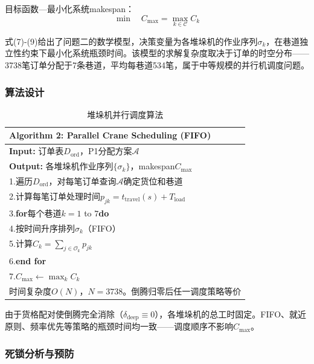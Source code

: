 \documentclass[a4paper]{cumcmthesis}
\newcommand{\headcol}{\rowcolor{tableheadcolor}}
\newcommand{\cO}{\mathcal{O}}
\newcommand{\cC}{\mathcal{C}}
\begin{document}
目标函数---最小化系统makespan：
\begin{equation}
\min\quad C_{\max}=\max_{k\in\cC}C_k
\end{equation}

式(7)-(9)给出了问题二的数学模型，决策变量为各堆垛机的作业序列$\sigma_k$，在巷道独立性约束下最小化系统瓶颈时间。该模型的求解复杂度取决于订单的时空分布——3738笔订单分配于7条巷道，平均每巷道534笔，属于中等规模的并行机调度问题。

\FloatBarrier\subsubsection{算法设计}

\begin{table}[htbp]
\centering\footnotesize
\caption{堆垛机并行调度算法}
\label{tab:algo2}
\begin{tabular}{p{}}
\toprule
\headcol \textbf{Algorithm 2: Parallel Crane Scheduling (FIFO)}\\
\midrule
\textbf{Input:} 订单表$D_{\text{ord}}$，P1分配方案$\mathcal{A}$\\
\textbf{Output:} 各堆垛机作业序列$\{\sigma_k\}$，makespan$C_{\max}$\\
\midrule
1.\quad 遍历$D_{\text{ord}}$，对每笔订单查询$\mathcal{A}$确定货位和巷道\\
2.\quad 计算每笔订单处理时间$p_{jk}=t_{\text{travel}}(s)+T_{\text{load}}$\\
3.\quad \textbf{for}每个巷道$k=1$ to $7$\textbf{do}\\
4.\quad\qquad 按时间升序排列$\sigma_k$（FIFO）\\
5.\quad\qquad 计算$C_k=\sum_{j\in\cO_k}p_{jk}$\\
6.\quad \textbf{end for}\\
7.\quad $C_{\max}\gets\max_k C_k$\\
\midrule
\multicolumn{1}{c}{时间复杂度$O(N)$，$N=3738$。倒腾归零后任一调度策略等价}\\
\bottomrule
\end{tabular}
\end{table}

由于货格配对使倒腾完全消除（$\delta_{\text{deep}}\equiv 0$），各堆垛机的总工时固定。FIFO、就近原则、频率优先等策略的瓶颈时间均一致——调度顺序不影响$C_{\max}$。

\FloatBarrier\subsubsection{死锁分析与预防}
\end{document}

